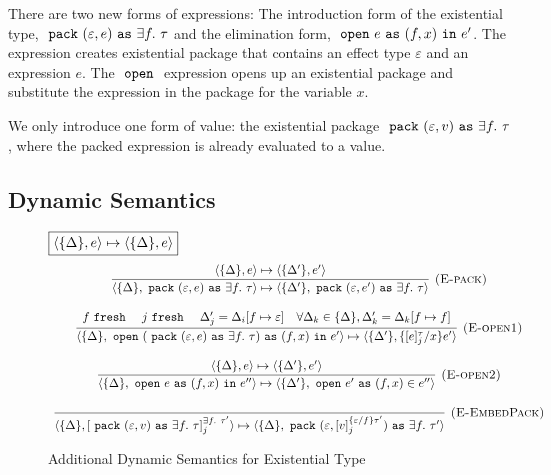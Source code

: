 There  are two new forms of expressions: The introduction form of the existential type, $\ \texttt{pack}\  (\varepsilon, e) \ \texttt{as}\  \exists f.\ \tau$ and the elimination form, $\ \texttt{open}\  e \ \texttt{as}\  (f, x) \ \texttt{in}\  e'$. The  expression creates existential package that contains an effect type $\varepsilon$ and an expression $e$.  The $\ \texttt{open}\ $ expression opens up an existential package and substitute the expression in the package for the variable $x$.

We only introduce one form of value: the existential package $\m{pack} (\varepsilon, v) \m{as} \exists f.\ \tau$, where the packed expression is already evaluated to a value.


\subsection{Dynamic Semantics}
\begin{figure}[t]
\footnotesize{
\noindent$\fbox{$\langle \{\Delta\}, e \rangle \mapsto \langle \{\Delta\}, e \rangle$}$
\[
\begin{array}{c}

\infer[\textsc{(E-pack)}]
  {\langle \{\Delta\}, \m{pack} (\varepsilon, e) \m{as} \exists f.\ \tau  \rangle \mapsto \langle \{\Delta'\} , \m{pack} (\varepsilon, e') \m{as} \exists f.\ \tau  \rangle}
  {\langle \{\Delta\}, e \rangle \mapsto \langle \{\Delta'\}, e' \rangle} \\[3ex]
  
\infer[\textsc{(E-open1)}]
   {\langle \{\Delta\},  \m{open} (\m{pack} (\varepsilon, e) \m{as} \exists f.\ \tau) \m{as} (f, x) \m{in} e'  \rangle \mapsto \langle \{\Delta'\}, \{[e]_j^\tau / x\}e' \rangle}
  {f \m{fresh} & j \m{fresh} & \Delta'_j = \Delta_i[f \mapsto \varepsilon] & \forall \Delta_k \in \{\Delta\}, \Delta_k' = \Delta_k[f \mapsto f]} \\[3ex]
  
\infer[\textsc{(E-open2)}]
   {\langle \{\Delta\},  \m{open} e \m{as} (f, x) \m{in} e''  \rangle \mapsto \langle \{\Delta'\}, \m{open} e' \m{as} (f, x) \in e''\rangle}
  {\langle \{\Delta\}, e \rangle \mapsto \langle \{\Delta'\}, e' \rangle} \\[3ex]
  
\infer[\textsc{(E-EmbedPack)}]
  {\langle \{\Delta\}, [\m{pack} (\varepsilon, v) \m{as} \exists f.\ \tau]^{\exists f.\ \tau'}_j \rangle \mapsto \langle \{\Delta\}, \m{pack} (\varepsilon, [v]^{\{\varepsilon/f\}\tau'}_j) \m{as} \exists f.\ \tau' \rangle}
  {}
  
\end{array}
\]
\caption{Additional Dynamic Semantics for Existential Type}
\label{static-exist}
}
\end{figure}

